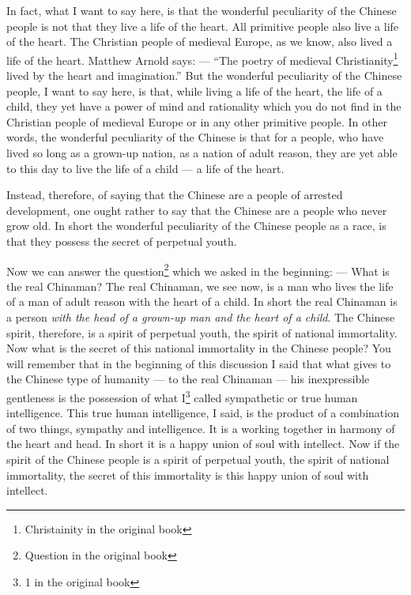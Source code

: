 In fact, what I want to say here, is that the wonderful peculiarity of the Chinese people is not that they live a life of the heart.
All primitive people also live a life of the heart.
The Christian people of medieval Europe, as we know, also lived a life of the heart.
Matthew Arnold  says: --- ``The poetry of medieval Christianity\footnote{Christainity in the original book} lived by the heart and imagination.''
But the wonderful peculiarity of the Chinese people, I want to say here, is that, while living a life of the heart, the life of a child, they yet have a power of mind and rationality which you do not find in the Christian people of medieval Europe or in any other primitive people.
In other words, the wonderful peculiarity of the Chinese is that for a people, who have lived so long as a grown-up nation, as a nation of adult reason, they are yet able to this day to live the life of a child --- a life of the heart.

Instead, therefore, of saying that the Chinese are a people of arrested development, one ought rather to say that the Chinese are a people who never grow old.
In short the wonderful peculiarity of the Chinese people as a race, is that they possess the secret of perpetual youth.

\vspace{0.5cm}
Now we can answer the question\footnote{Question in the original book} which we asked in the beginning: --- What is the real Chinaman?
The real Chinaman, we see now, is a man who lives the life of a man of adult reason with the heart of a child.
In short the real Chinaman is a person \emph{with the head of a grown-up man and the heart of a child}.
The Chinese spirit, therefore, is a spirit of perpetual youth, the spirit of national immortality.
Now what is the secret of this national immortality in the Chinese people?
You will remember that in the beginning of this discussion I said that what gives to the Chinese type of humanity --- to the real Chinaman --- his inexpressible gentleness is the possession of what I\footnote{1 in the original book} called sympathetic or true human intelligence.
This true human intelligence, I said, is the product of a combination of two things, sympathy and intelligence.
It is a working together in harmony of the heart and head.
In short it is a happy union of soul with intellect.
Now if the spirit of the Chinese people is a spirit of perpetual youth, the spirit of national immortality, the secret of this immortality is this happy union of soul with intellect.

